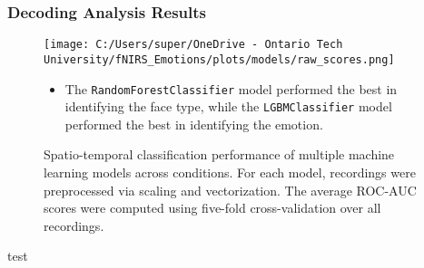\documentclass{beamer}
\begin{document}
\begin{frame}
    \frametitle{Decoding Analysis Results}
    \begin{figure}
        \texttt{[image: C:/Users/super/OneDrive - Ontario Tech University/fNIRS\_Emotions/plots/models/raw\_scores.png]}
        \caption{Spatio-temporal classification performance of multiple machine learning models across conditions. For each model, recordings were preprocessed via scaling and vectorization. The average ROC-AUC scores were computed using five-fold cross-validation over all recordings. }
        \begin{itemize}
            \item The \texttt{RandomForestClassifier} model performed the best in identifying the face type, while the \texttt{LGBMClassifier} model performed the best in identifying the emotion.
        \end{itemize}
    \end{figure}
\end{frame}

\begin{frame}
    test
\end{frame}
\end{document}
